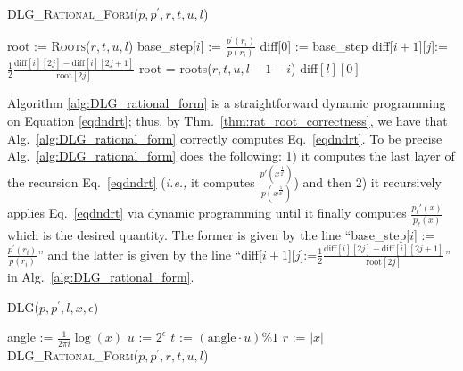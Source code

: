 \documentclass[sigconf]{acmart}
\begin{document}
\begin{algorithm}
\caption{\textsc{DLG\_Rational\_Form}($p,p^\prime,r,t,u,l$)}
\label{alg:DLG_rational_form}
\begin{algorithmic}
\STATE 	root      := \textsc{Roots}($r,t,u,l$)
\STATE 	base\_step[$i$] := $\frac{p^\prime(r_i)}{p(r_i)}$
\ENDFOR
\STATE  diff[0]   := base\_step
\STATE 			diff[$i+1$][$j$]:=$\frac{1}{2}\frac{\text{diff}[i][2j]-\text{diff}[i][2j+1]}{\text{root}[2j]}$
\STATE 		root = roots($r,t,u,l-1-i$)
\ENDFOR
\ENDFOR
\RETURN diff$[l][0]$
\end{algorithmic}
\end{algorithm}
Algorithm \ref{alg:DLG_rational_form} is a straightforward dynamic programming on Equation \ref{eqdndrt}; thus, by Thm.~\ref{thm:rat_root_correctness}, we have that Alg.~\ref{alg:DLG_rational_form} correctly computes Eq.~\ref{eqdndrt}.
To be precise Alg.~\ref{alg:DLG_rational_form} does the following: 1) it computes the last layer of the recursion Eq.~\ref{eqdndrt} (\emph{i.e.,} it computes $\frac{p'(x^{\frac{1}{2^l}})}{p(x^{\frac{1}{2^l}})}$) and then 2) it recursively applies Eq.~\ref{eqdndrt} via dynamic programming until it finally computes $\frac{p_{\ell}'(x)}{p_{\ell}(x)}$ which is the desired quantity.
The former is given by the line ``base\_step[$i$] := $\frac{p^\prime(r_i)}{p(r_i)}$'' and the latter is given by the line ``diff[$i+1$][$j$]:=$\frac{1}{2}\frac{\text{diff}[i][2j]-\text{diff}[i][2j+1]}{\text{root}[2j]}$'' in Alg.~\ref{alg:DLG_rational_form}.




\begin{algorithm}
\caption{\textsc{DLG}($p,p^\prime,l,x, \epsilon$)}
\label{alg:rational_angle_approx}
\begin{algorithmic}
\STATE angle     := $\frac{1}{2\pi i} \log (x)$
\STATE $u $    := $2^{\epsilon}$
\STATE$t$      :=  $(\text{angle} \cdot u)\% 1$
\STATE $r$      := $|x|$
\RETURN \textsc{DLG\_Rational\_Form}($p,p^\prime,r,t,u,l$)
\end{algorithmic}
\end{algorithm}

%




\end{document}

